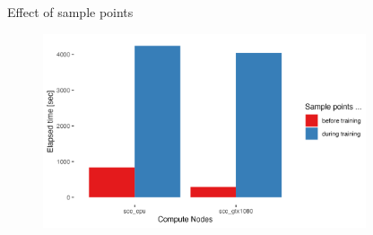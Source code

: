 \documentclass[compress,aspectratio=169]{beamer}
\begin{document}
\begin{frame}{Effect of sample points}
    \vspace{-1em}
    \begin{center}
    \begin{figure}
        \includegraphics[width=0.85\textwidth]{../../data/sacct_barplot_by_nodes_sample-points-effect}
    \end{figure}
    \end{center}
\end{frame}
\end{document}
